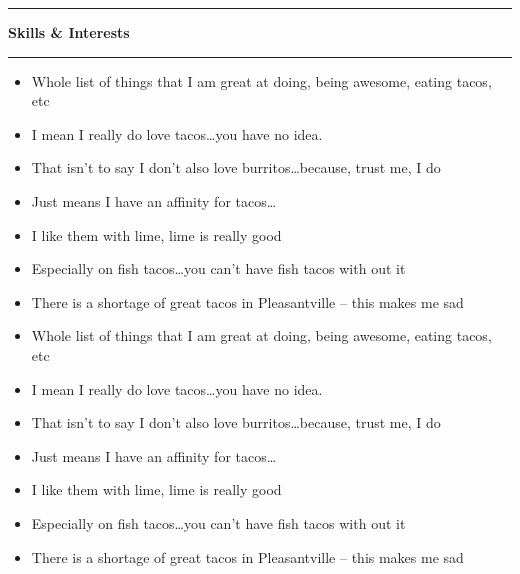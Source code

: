 \documentclass[10pt,letterpaper]{article}			%
\newcommand{
    \sectionHeader}[1]{
    \hrule
    \vspace{0.2em}
    {\large \textbf {#1}}
    \vspace{0.2em}
    \hrule
    \vspace{0.2em}
    }
\begin{document}
\sectionHeader{Skills \& Interests}
\begin{minipage}[t]{0.5\textwidth}	
	\begin{itemize}
	    \item Whole list of things that I am great at doing, being awesome, eating tacos, etc
	    \item I mean I really do love tacos\ldots you have no idea.
	    \item That isn't to say I don't also love burritos\ldots because, trust me, I do
	    \item Just means I have an affinity for tacos\ldots
	    \item I like them with lime, lime is really good
	    \item Especially on fish tacos\ldots you can't have fish tacos with out it
	    \item There is a shortage of great tacos in Pleasantville -- this makes me sad
	\end{itemize}
\end{minipage}
\begin{minipage}[t]{0.5\textwidth}
	\begin{itemize}
        \item Whole list of things that I am great at doing, being awesome, eating tacos, etc
	    \item I mean I really do love tacos\ldots you have no idea.
	    \item That isn't to say I don't also love burritos\ldots because, trust me, I do
	    \item Just means I have an affinity for tacos\ldots
	    \item I like them with lime, lime is really good
	    \item Especially on fish tacos\ldots you can't have fish tacos with out it
	    \item There is a shortage of great tacos in Pleasantville -- this makes me sad
	\end{itemize}
\end{minipage}
\end{document}
